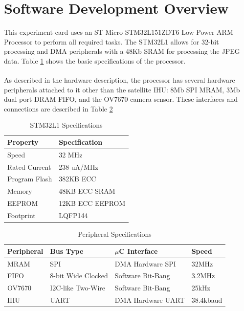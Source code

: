 \documentclass[10pt]{article}
\begin{document}
\section*{Software Development Overview}

\paragraph*{}This experiment card uses an ST Micro STM32L151ZDT6 Low-Power ARM Processor to perform all required tasks.  The STM32L1 allows for 32-bit processing and DMA peripherals with a 48Kb SRAM for processing the JPEG data.  Table \ref{spec_table} shows the basic specifications of the processor.

\paragraph*{}As described in the hardware description, the processor has several hardware peripherals attached to it other than the satellite IHU: 8Mb SPI MRAM, 3Mb dual-port DRAM FIFO, and the OV7670 camera sensor.  These interfaces and connections are described in Table \ref{bus_table}

\begin{table}
	\centering
	\caption{STM32L1 Specifications}
	\begin{tabular}{ll}
	\hline
	Property & Specification \\
	\hline
	\hline
	Speed & 32 MHz \\
	Rated Current & 238 uA/MHz \\
	Program Flash & 382KB ECC \\
	Memory & 48KB ECC SRAM \\
	EEPROM & 12KB ECC EEPROM \\
	Footprint & LQFP144\\
	\end{tabular}
	\label{spec_table}
\end{table}

\begin{table}
	\centering
	\caption{Peripheral Specifications}
	\begin{tabular}{llll}
	\hline
	Peripheral & Bus Type & $\mu$C Interface & Speed \\
	\hline
	\hline
	MRAM & SPI & DMA Hardware SPI & 32MHz \\
	FIFO & 8-bit Wide Clocked & Software Bit-Bang & 3.2MHz \\
	OV7670 & I2C-like Two-Wire & Software Bit-Bang & 25kHz \\
	IHU & UART & DMA Hardware UART & 38.4kbaud \\
	\end{tabular}
	\label{bus_table}	
\end{table}
\end{document}
